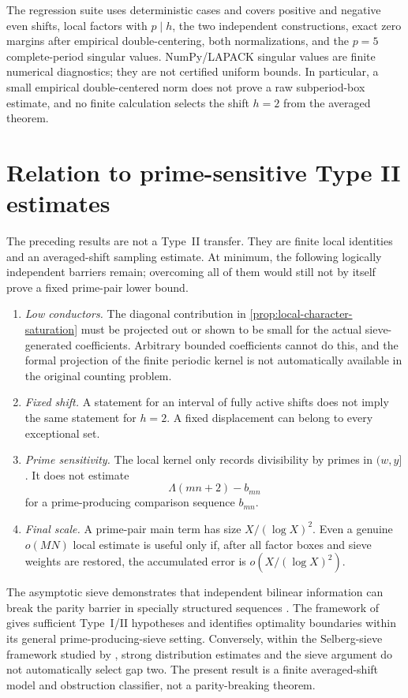 \documentclass[11pt]{article}
\theoremstyle{definition}
\theoremstyle{remark}
\begin{document}
The regression suite uses deterministic cases and covers positive and negative even shifts, local factors with $p\mid h$, the two independent constructions, exact zero margins after empirical double-centering, both normalizations, and the $p=5$ complete-period singular values.  NumPy/LAPACK singular values are finite numerical diagnostics; they are not certified uniform bounds.  In particular, a small empirical double-centered norm does not prove a raw subperiod-box estimate, and no finite calculation selects the shift $h=2$ from the averaged theorem.

\section{Relation to prime-sensitive Type II estimates}\label{sec:type-II-boundary}

The preceding results are not a Type~II transfer.  They are finite local identities and an averaged-shift sampling estimate.  At minimum, the following logically independent barriers remain; overcoming all of them would still not by itself prove a fixed prime-pair lower bound.
\begin{enumerate}[label=\textbf{B\arabic*.},leftmargin=3.2em]
 \item \emph{Low conductors.}  The diagonal contribution in \cref{prop:local-character-saturation} must be projected out or shown to be small for the actual sieve-generated coefficients.  Arbitrary bounded coefficients cannot do this, and the formal projection of the finite periodic kernel is not automatically available in the original counting problem.
 \item \emph{Fixed shift.}  A statement for an interval of fully active shifts does not imply the same statement for $h=2$.  A fixed displacement can belong to every exceptional set.
 \item \emph{Prime sensitivity.}  The local kernel only records divisibility by primes in $(w,y]$.  It does not estimate
 \[
  \Lambda(mn+2)-b_{mn}
 \]
 for a prime-producing comparison sequence $b_{mn}$.
 \item \emph{Final scale.}  A prime-pair main term has size $X/(\log X)^2$.  Even a genuine $o(MN)$ local estimate is useful only if, after all factor boxes and sieve weights are restored, the accumulated error is $o(X/(\log X)^2)$.
\end{enumerate}

The asymptotic sieve demonstrates that independent bilinear information can break the parity barrier in specially structured sequences \citep{FriedlanderIwaniec1998}.  The framework of \citet{FordMaynard2024} gives sufficient Type~I/II hypotheses and identifies optimality boundaries within its general prime-producing-sieve setting.  Conversely, within the Selberg-sieve framework studied by \citet{DHJPolymath2014}, strong distribution estimates and the sieve argument do not automatically select gap two.  The present result is a finite averaged-shift model and obstruction classifier, not a parity-breaking theorem.
\end{document}
